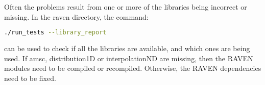 Often the problems result from one or more of the libraries being
incorrect or missing.  In the raven directory, the command:

\begin{lstlisting}[language=bash]
./run_tests --library_report
\end{lstlisting}
can be used to check if all the libraries are available, and which
ones are being used.  If amsc, distribution1D or interpolationND are
missing, then the RAVEN modules need to be compiled or recompiled.
Otherwise, the RAVEN dependencies need to be fixed.



